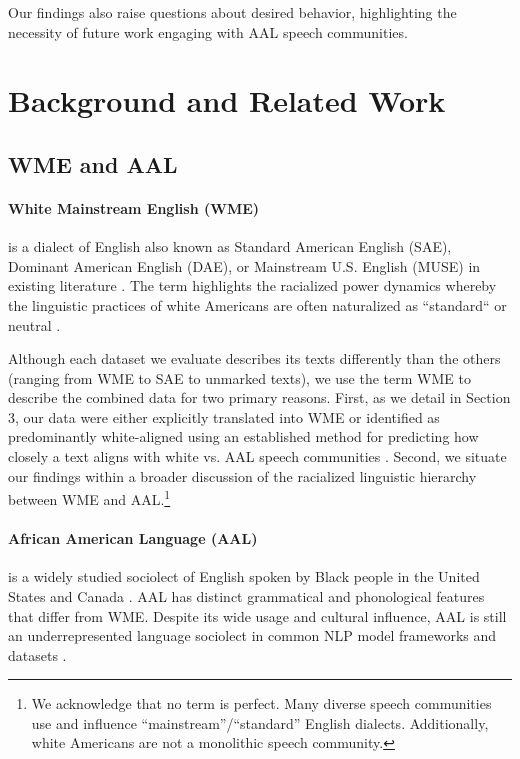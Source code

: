 Our findings also raise questions about desired behavior, highlighting the necessity of future work engaging with AAL speech communities.

\section{Background and Related Work}
\subsection{WME and AAL}
\paragraph{White Mainstream English (WME)} is a dialect of English also known as Standard American English (SAE), Dominant American English (DAE), or Mainstream U.S. English (MUSE) in existing literature \cite{rosa_unsettling_2017, alim2016, blodgett2021sociolinguistically}. The term highlights the racialized power dynamics whereby the linguistic practices of white Americans are often naturalized as ``standard`` or neutral \cite{baker2020linguistic, alim_articulate_2012}.

Although each dataset we evaluate describes its texts differently than the others (ranging from WME to SAE to unmarked texts), we use the term WME to describe the combined data for two primary reasons. First, as we detail in Section 3, our data were either explicitly translated into WME or identified as predominantly white-aligned using an established method for predicting how closely a text aligns with white vs. AAL speech communities \cite{blodgett_demographic_2016}. Second, we situate our findings within a broader discussion of the racialized linguistic hierarchy between WME and AAL.\footnote{We acknowledge that no term is perfect. Many diverse speech communities use and influence ``mainstream''/``standard'' English dialects. Additionally, white Americans are not a monolithic speech community.}

\paragraph{African American Language (AAL)} is a widely studied sociolect of English spoken by Black people in the United States and Canada \cite{green2002african, grieser2022black, baker2020linguistic}. AAL has distinct grammatical and phonological features that differ from WME. Despite its wide usage and cultural influence, AAL is still an underrepresented language sociolect in common NLP model frameworks and datasets \cite{dacon-2022-towards}. 

